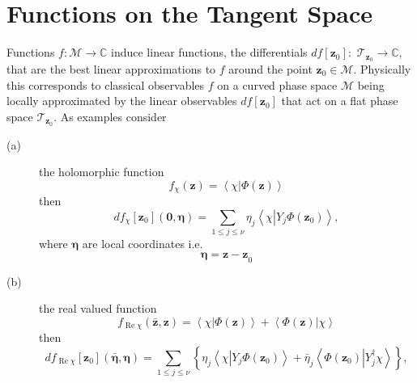 \documentclass[aps,preprint]{revtex4}%
\begin{document}
\section{Functions on the Tangent Space\label{functions}}

Functions $f:\mathcal{M}\rightarrow\mathbb{C}$ induce linear functions, the
differentials $df\left[  \mathbf{z}_{0}\right]  :$ $\mathcal{T}_{\mathbf{z}%
_{0}}\rightarrow\mathbb{C}$, that are the best linear approximations to $f$
around the point $\mathbf{z}_{0}\in\mathcal{M}$. Physically this corresponds
to classical observables $f$ on a curved phase space $\mathcal{M}$ being
locally approximated by the linear observables $df\left[  \mathbf{z}%
_{0}\right]  $ that act on a flat phase space $\mathcal{T}_{\mathbf{z}_{0}}$.
As examples consider

\begin{description}
\item[(a)] the holomorphic function
\begin{equation}
f_{\chi}\left(  \mathbf{z}\right)  =\left\langle \chi\left\vert \Phi\left(
\mathbf{z}\right)  \right.  \right\rangle
\end{equation}
then
\begin{equation}
df_{\chi}\left[  \mathbf{z}_{0}\right]  \left(  \mathbf{0,\eta}\right)
=\sum_{1\leq j\leq\nu}\eta_{j}\left\langle \chi\left\vert Y_{j}\Phi\left(
\mathbf{z}_{0}\right)  \right.  \right\rangle ,
\end{equation}
where $\mathbf{\eta}$ are local coordinates i.e.
\begin{equation}
\mathbf{\eta=z-z}_{0}%
\end{equation}


\item[(b)] the real valued function%
\begin{equation}
f_{\operatorname{Re}\chi}\left(  \mathbf{\bar{z},z}\right)  =\left\langle
\chi\left\vert \Phi\left(  \mathbf{z}\right)  \right.  \right\rangle
+\left\langle \Phi\left(  \mathbf{z}\right)  \left\vert \chi\right.
\right\rangle
\end{equation}
then
\begin{equation}
df_{\operatorname{Re}\chi}\left[  \mathbf{z}_{0}\right]  \left(
\mathbf{\bar{\eta},\eta}\right)  =\sum_{1\leq j\leq\nu}\left\{  \eta
_{j}\left\langle \chi\left\vert Y_{j}\Phi\left(  \mathbf{z}_{0}\right)
\right.  \right\rangle +\bar{\eta}_{j}\left\langle \Phi\left(  \mathbf{z}%
_{0}\right)  \left\vert Y_{j}^{\dagger}\right.  \chi\right\rangle \right\}  ,
\end{equation}



\end{description}
\end{document}

